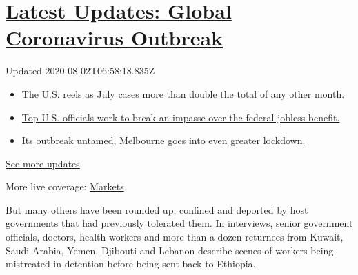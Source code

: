 \hypertarget{latest-updates-global-coronavirus-outbreak}{%
\section{\texorpdfstring{\href{https://www.nytimes.com/2020/08/01/world/coronavirus-covid-19.html?action=click\&pgtype=Article\&state=default\&region=MAIN_CONTENT_1\&context=storylines_live_updates}{Latest
Updates: Global Coronavirus
Outbreak}}{Latest Updates: Global Coronavirus Outbreak}}\label{latest-updates-global-coronavirus-outbreak}}

Updated 2020-08-02T06:58:18.835Z

\begin{itemize}
\tightlist
\item
  \href{https://www.nytimes.com/2020/08/01/world/coronavirus-covid-19.html?action=click\&pgtype=Article\&state=default\&region=MAIN_CONTENT_1\&context=storylines_live_updates\#link-34047410}{The
  U.S. reels as July cases more than double the total of any other
  month.}
\item
  \href{https://www.nytimes.com/2020/08/01/world/coronavirus-covid-19.html?action=click\&pgtype=Article\&state=default\&region=MAIN_CONTENT_1\&context=storylines_live_updates\#link-780ec966}{Top
  U.S. officials work to break an impasse over the federal jobless
  benefit.}
\item
  \href{https://www.nytimes.com/2020/08/01/world/coronavirus-covid-19.html?action=click\&pgtype=Article\&state=default\&region=MAIN_CONTENT_1\&context=storylines_live_updates\#link-2bc8948}{Its
  outbreak untamed, Melbourne goes into even greater lockdown.}
\end{itemize}

\href{https://www.nytimes.com/2020/08/01/world/coronavirus-covid-19.html?action=click\&pgtype=Article\&state=default\&region=MAIN_CONTENT_1\&context=storylines_live_updates}{See
more updates}

More live coverage:
\href{https://www.nytimes.com/live/2020/07/31/business/stock-market-today-coronavirus?action=click\&pgtype=Article\&state=default\&region=MAIN_CONTENT_1\&context=storylines_live_updates}{Markets}

But many others have been rounded up, confined and deported by host
governments that had previously tolerated them. In interviews, senior
government officials, doctors, health workers and more than a dozen
returnees from Kuwait, Saudi Arabia, Yemen, Djibouti and Lebanon
describe scenes of workers being mistreated in detention before being
sent back to Ethiopia.

